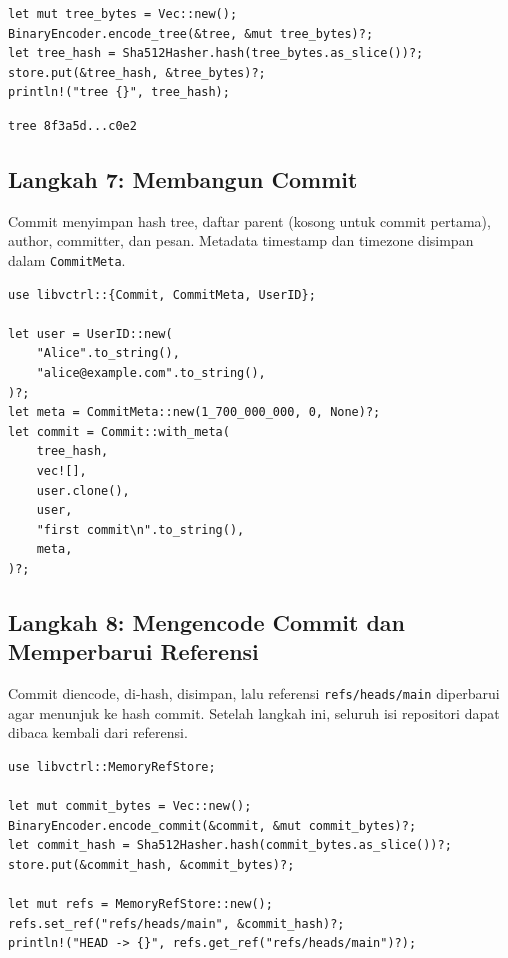 \documentclass[11pt,a4paper]{article}
\begin{document}
\begin{lstlisting}[style=code]
let mut tree_bytes = Vec::new();
BinaryEncoder.encode_tree(&tree, &mut tree_bytes)?;
let tree_hash = Sha512Hasher.hash(tree_bytes.as_slice())?;
store.put(&tree_hash, &tree_bytes)?;
println!("tree {}", tree_hash);
\end{lstlisting}

\begin{lstlisting}[style=out]
tree 8f3a5d...c0e2
\end{lstlisting}

\subsection{Langkah 7: Membangun Commit}

Commit menyimpan hash tree, daftar parent (kosong untuk commit pertama), author, committer, dan pesan. Metadata timestamp dan timezone disimpan dalam \texttt{CommitMeta}.

\begin{lstlisting}[style=code]
use libvctrl::{Commit, CommitMeta, UserID};

let user = UserID::new(
    "Alice".to_string(),
    "alice@example.com".to_string(),
)?;
let meta = CommitMeta::new(1_700_000_000, 0, None)?;
let commit = Commit::with_meta(
    tree_hash,
    vec![],
    user.clone(),
    user,
    "first commit\n".to_string(),
    meta,
)?;
\end{lstlisting}

\subsection{Langkah 8: Mengencode Commit dan Memperbarui Referensi}

Commit diencode, di-hash, disimpan, lalu referensi \texttt{refs/heads/main} diperbarui agar menunjuk ke hash commit. Setelah langkah ini, seluruh isi repositori dapat dibaca kembali dari referensi.

\begin{lstlisting}[style=code]
use libvctrl::MemoryRefStore;

let mut commit_bytes = Vec::new();
BinaryEncoder.encode_commit(&commit, &mut commit_bytes)?;
let commit_hash = Sha512Hasher.hash(commit_bytes.as_slice())?;
store.put(&commit_hash, &commit_bytes)?;

let mut refs = MemoryRefStore::new();
refs.set_ref("refs/heads/main", &commit_hash)?;
println!("HEAD -> {}", refs.get_ref("refs/heads/main")?);
\end{lstlisting}
\end{document}

